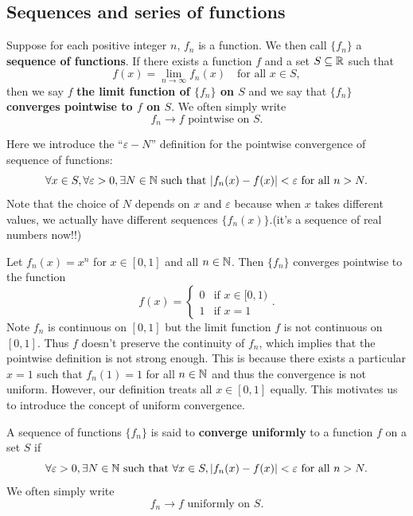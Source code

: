 \documentclass[a4paper]{ctexart}
\begin{document}
    \subsection{Sequences and series of functions}
    \begin{mydef}
        Suppose for each positive integer $n$, $f_n$ is a function. We then call $\{f_n\}$ a \textbf{sequence of functions}. If there exists a function $f$ and a set $S\subseteq \mathbb{R}$ such that
        \[
        f(x) = \lim_{n\to \infty} f_n(x) \quad \text{for all } x\in S,
        \]
        then we say $f$ \textbf{the limit function of $\{f_n\}$ on $S$} and we say that $\{f_n\}$ \textbf{converges pointwise to $f$ on $S$}. We often simply write
        \[
        f_n \to f \text{ pointwise on } S.
        \]
    \end{mydef}
    \begin{myrmk}
        Here we introduce the ``$\varepsilon -N$'' definition for the pointwise convergence of sequence of functions:
        \[
        \forall x\in S, \forall \varepsilon >0, \exists N\in \mathbb{N} \text{ such that } |f_n(x) - f(x)| < \varepsilon \text{ for all } n > N.
        \]
        Note that the choice of $N$ depends on $x$ and $\varepsilon$ because when $x$ takes different values, we actually have different sequences $\{f_n(x)\}$.(it's a sequence of real numbers now!!)
    \end{myrmk}
    \begin{myex}
        Let $f_n(x) = x^n$ for $x\in [0,1]$ and all $n\in \mathbb{N}$. Then $\{f_n\}$ converges pointwise to the function
        \[
        f(x) = \begin{cases}
        0 & \text{if } x\in [0,1)\\
        1 & \text{if } x=1
        \end{cases}.
        \]
        Note $f_n$ is continuous on $[0,1]$ but the limit function $f$ is not continuous on $[0,1]$. Thus $f$ doesn't preserve the continuity of $f_n$, which implies that the pointwise definition is not strong enough. This is because there exists a particular $x=1$ such that $f_n(1) = 1$ for all $n\in \mathbb{N}$ and thus the convergence is not uniform. However, our definition treats all $x\in [0,1]$ equally. This motivates us to introduce the concept of uniform convergence.
    \end{myex}
    \begin{mydef}
        A sequence of functions $\{f_n\}$ is said to \textbf{converge uniformly} to a function $f$ on a set $S$ if
        \[
        \forall \varepsilon >0, \exists N\in \mathbb{N} \text{ such that } \forall x\in S, |f_n(x) - f(x)| < \varepsilon \text{ for all } n > N.
        \]
        We often simply write
        \[
        f_n \to f \text{ uniformly on } S.
        \]
    \end{mydef}
\end{document}
